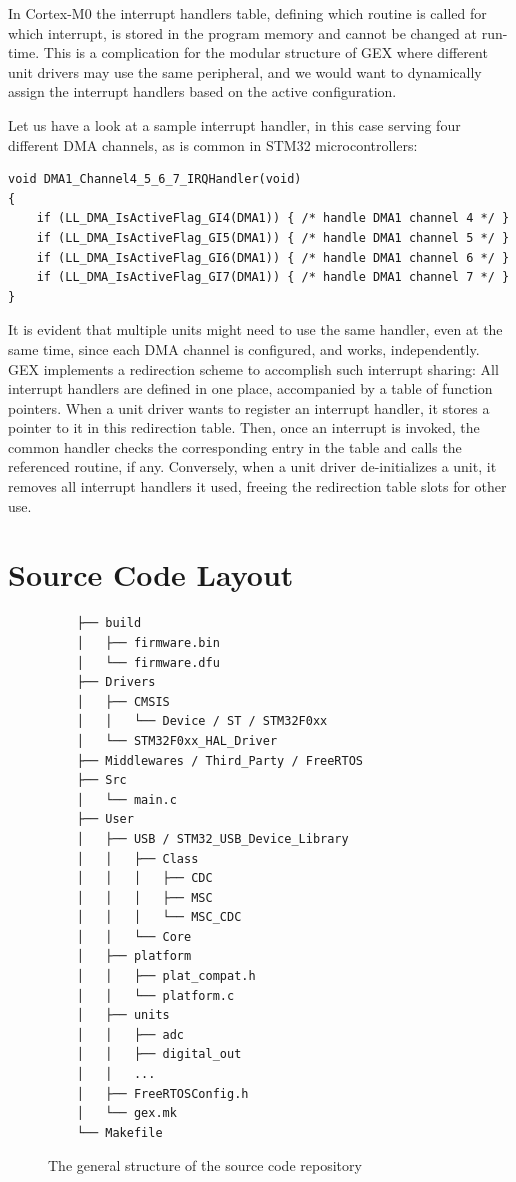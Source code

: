 In \arm Cortex-M0 the interrupt handlers table, defining which routine is called for which interrupt, is stored in the program memory and cannot be changed at run-time. This is a complication for the modular structure of GEX where different unit drivers may use the same peripheral, and we would want to dynamically assign the interrupt handlers based on the active configuration. 


Let us have a look at a sample interrupt handler, in this case serving four different \gls{DMA} channels, as is common in STM32 microcontrollers:

\begin{verbatim}
void DMA1_Channel4_5_6_7_IRQHandler(void)
{
    if (LL_DMA_IsActiveFlag_GI4(DMA1)) { /* handle DMA1 channel 4 */ }
    if (LL_DMA_IsActiveFlag_GI5(DMA1)) { /* handle DMA1 channel 5 */ }
    if (LL_DMA_IsActiveFlag_GI6(DMA1)) { /* handle DMA1 channel 6 */ }
    if (LL_DMA_IsActiveFlag_GI7(DMA1)) { /* handle DMA1 channel 7 */ }
}
\end{verbatim}

It is evident that multiple units might need to use the same handler, even at the same time, since each \gls{DMA} channel is configured, and works, independently. GEX implements a redirection scheme to accomplish such interrupt sharing: All interrupt handlers are defined in one place, accompanied by a table of function pointers. When a unit driver wants to register an interrupt handler, it stores a pointer to it in this redirection table. Then, once an interrupt is invoked, the common handler checks the corresponding entry in the table and calls the referenced routine, if any. Conversely, when a unit driver de-initializes a unit, it removes all interrupt handlers it used, freeing the redirection table slots for other use.



\section{Source Code Layout}

\begin{figure}
	\scriptsize\vspace{-3em}
	\begin{verbatim}
	├── build
	│   ├── firmware.bin
	│   └── firmware.dfu
	├── Drivers
	│   ├── CMSIS
	│   │   └── Device / ST / STM32F0xx
	│   └── STM32F0xx_HAL_Driver
	├── Middlewares / Third_Party / FreeRTOS
	├── Src
	│   └── main.c
	├── User
	│   ├── USB / STM32_USB_Device_Library
	│   │   ├── Class
	│   │   │   ├── CDC
	│   │   │   ├── MSC
	│   │   │   └── MSC_CDC
	│   │   └── Core
	│   ├── platform
	│   │   ├── plat_compat.h
	│   │   └── platform.c
	│   ├── units
	│   │   ├── adc
	│   │   ├── digital_out
	│   │   ...
	│   ├── FreeRTOSConfig.h
	│   └── gex.mk
	└── Makefile
	\end{verbatim}
	\vspace{-1em}
	\caption{\label{fig:repo-structure} The general structure of the source code repository}
\end{figure}

